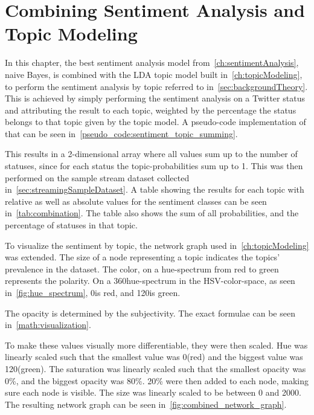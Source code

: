 \chapter{Combining Sentiment Analysis and Topic Modeling}
\label{ch:combiningSentimentAnalysisAndTopicModeling}

In this chapter, the best sentiment analysis model from~\cref{ch:sentimentAnalysis}, naive Bayes,
is combined with the LDA topic model built in~\cref{ch:topicModeling},
to perform the sentiment analysis by topic referred to in~\cref{sec:backgroundTheory}.
\\
This is achieved by simply performing the sentiment analysis on a Twitter status and attributing the result to each topic,
weighted by the percentage the status belongs to that topic given by the topic model.
A pseudo-code implementation of that can be seen in~\cref{pseudo_code:sentiment_topic_summing}.

This results in a 2-dimensional array where all values sum up to the number of statuses,
since for each status the topic-probabilities sum up to 1.
This was then performed on the sample stream dataset collected in~\cref{sec:streamingSampleDataset}.
A table showing the results for each topic with relative as well as absolute values for the sentiment classes can be seen in~\cref{tab:combination}.
The table also shows the sum of all probabilities, and the percentage of statuses in that topic.

To visualize the sentiment by topic,
the network graph used in~\cref{ch:topicModeling} was extended.
The size of a node representing a topic indicates the topics' prevalence in the dataset.
The color, on a hue-spectrum from red to green represents the polarity.
On a 360\degree hue-spectrum in the HSV-color-space, as seen in~\cref{fig:hue_spectrum}, 0\degree is red, and 120\degree is green.

The opacity is determined by the subjectivity.
The exact formulae can be seen in~\cref{math:visualization}.

\begin{absolutelynopagebreak}
    To make these values visually more differentiable, they were then scaled.
    Hue was linearly scaled such that the smallest value was 0\degree (red) and the biggest value was 120\degree (green).
    The saturation was linearly scaled such that the smallest opacity was 0\%,
    and the biggest opacity was 80\%.
    20\% were then added to each node, making sure each node is visible.
    The size was linearly scaled to be between 0 and 2000.
    The resulting network graph can be seen in~\cref{fig:combined_network_graph}.
\end{absolutelynopagebreak}

